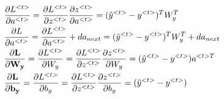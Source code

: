 \documentclass{article}
\begin{document}
\subsection{}
\begin{align*}
    &\pdv{L^{<t>}}{a^{<t>}} = \pdv{L^{<t>}}{z^{<t>}}\pdv{z^{<t>}}{a^{<t>}} = (\hat{y}^{<t>} - y^{<t>})^T W_y^T \\
    &\pdv{L}{a^{<t>}} = \pdv{L^{<t>}}{a^{<t>}} + da_{next} = (\hat{y}^{<t>} - y^{<t>})^T W_y^T +  da_{next} \\
    &\mathbf{\pdv{L}{W_y}} = \pdv{L^{<t>}}{W_y} = \pdv{L^{<t>}}{z^{<t>}} \pdv{z^{<t>}}{W_y} = (\hat{y}^{<t>} - y^{<t>})a^{<t>T} \qquad \qquad \qquad \qquad \qquad\\
    &\mathbf{\pdv{L}{b_y}} = \pdv{L^{<t>}}{b_y} = \pdv{L^{<t>}}{z^{<t>}}\pdv{z^{<t>}}{b_y} = (\hat{y}^{<t>} - y^{<t>}) \\
\end{align*}
\end{document}
